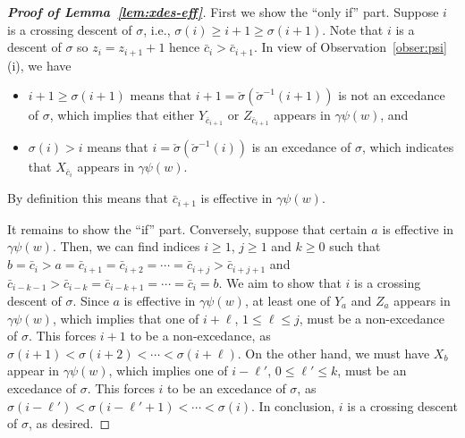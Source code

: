 \documentclass[12pt]{amsart} %
\numberwithin{equation}{section}
\theoremstyle{plain}
\theoremstyle{definition}
\begin{document}
\begin{proof}[{\bf Proof of Lemma~\ref{lem:xdes-eff}}]
First we show the  ``only if'' part. Suppose $i$ is a crossing descent of $\sigma$, i.e., $\sigma(i)\ge i+1\ge \sigma(i+1)$. Note that $i$ is a descent of $\sigma$ so $z_i=z_{i+1}+1$ hence $\bar c_i>\bar c_{i+1}$. In view of  Observation~\ref{obser:psi} (i),  we have 
\begin{itemize}
\item $i+1\ge \sigma(i+1)$ means that $i+1=\check\sigma(\check\sigma^{-1}(i+1))$ is not an excedance of $\sigma$, which implies that either $Y_{\bar c_{i+1}}$ or $Z_{\bar c_{i+1}}$ appears in $\gamma\psi(w)$, and
\item $\sigma(i)>i$ means that $i=\check\sigma(\check\sigma^{-1}(i))$ is an excedance of $\sigma$, which indicates that $X_{\bar c_i}$  appears in $\gamma\psi(w)$. 
\end{itemize}
By definition this means that $\bar c_{i+1}$ is effective in $\gamma\psi(w)$.

It remains to show the ``if'' part. Conversely, suppose that certain  $a$  is effective in $\gamma\psi(w)$. Then, we can find indices $i\geq1$, $j\geq1$ and $k\geq0$ such that  $b=\bar c_i>a=\bar c_{i+1}=\bar c_{i+2}=\cdots=\bar c_{i+j}>\bar c_{i+j+1}$ and $\bar c_{i-k-1}>\bar c_{i-k}=\bar c_{i-k+1}=\cdots=\bar c_i=b$.  We aim to show that $i$ is a crossing descent of $\sigma$. Since $a$ is effective in $\gamma\psi(w)$, at least one of $Y_a$ and $Z_a$ appears in $\gamma\psi(w)$, which implies that one of $i+\ell$, $1\leq \ell\leq j$, must be a non-excedance of $\sigma$. This forces $i+1$ to be a non-excedance, as $\sigma(i+1)<\sigma(i+2)<\cdots<\sigma(i+\ell)$. On the other hand, we must have $X_b$ appear in $\gamma\psi(w)$, which implies one of $i-\ell'$, $0\leq \ell'\leq k$, must be an excedance of $\sigma$.
This forces $i$ to be an excedance of $\sigma$, as $\sigma(i-\ell')<\sigma(i-\ell'+1)<\cdots<\sigma(i)$. 
In conclusion, $i$ is a crossing descent of $\sigma$, as desired. 
\end{proof}
\end{document}
